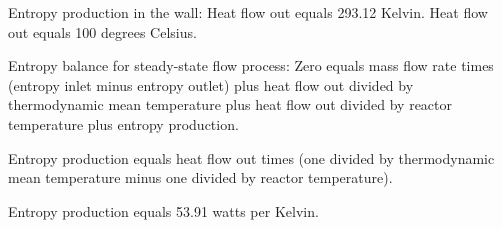 Entropy production in the wall:  
Heat flow out equals 293.12 Kelvin.  
Heat flow out equals 100 degrees Celsius.  

Entropy balance for steady-state flow process:  
Zero equals mass flow rate times (entropy inlet minus entropy outlet) plus heat flow out divided by thermodynamic mean temperature plus heat flow out divided by reactor temperature plus entropy production.  

Entropy production equals heat flow out times (one divided by thermodynamic mean temperature minus one divided by reactor temperature).  

Entropy production equals 53.91 watts per Kelvin.
